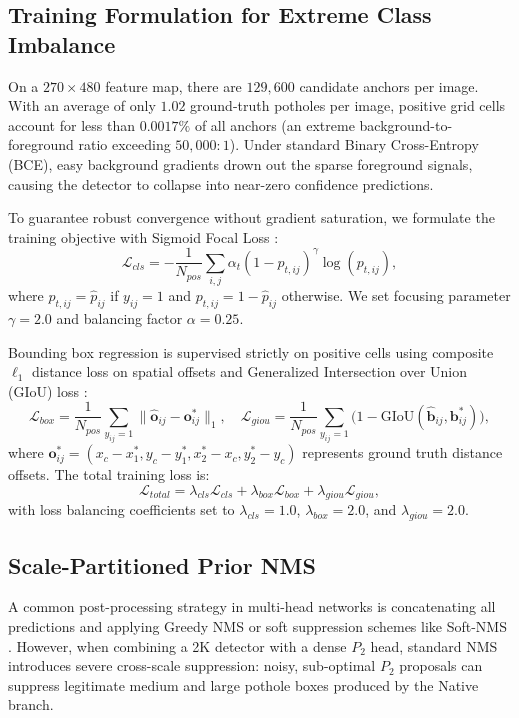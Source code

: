 \documentclass[runningheads]{llncs}
\begin{document}
\subsection{Training Formulation for Extreme Class Imbalance}
On a $270 \times 480$ feature map, there are $129,600$ candidate anchors per image. With an average of only $1.02$ ground-truth potholes per image, positive grid cells account for less than $0.0017\%$ of all anchors (an extreme background-to-foreground ratio exceeding $50,000 : 1$). Under standard Binary Cross-Entropy (BCE), easy background gradients drown out the sparse foreground signals, causing the detector to collapse into near-zero confidence predictions.

To guarantee robust convergence without gradient saturation, we formulate the training objective with Sigmoid Focal Loss \cite{lin2017focal}:
\begin{equation}
    \mathcal{L}_{cls} = -\frac{1}{N_{pos}} \sum_{i, j} \alpha_t (1 - p_{t, ij})^\gamma \log(p_{t, ij}),
\end{equation}
where $p_{t, ij} = \hat{p}_{ij}$ if $y_{ij} = 1$ and $p_{t, ij} = 1 - \hat{p}_{ij}$ otherwise. We set focusing parameter $\gamma = 2.0$ and balancing factor $\alpha = 0.25$.

Bounding box regression is supervised strictly on positive cells using composite $\ell_1$ distance loss on spatial offsets and Generalized Intersection over Union (GIoU) loss \cite{rezatofighi2019generalized,zheng2020distance}:
\begin{equation}
    \mathcal{L}_{box} = \frac{1}{N_{pos}} \sum_{y_{ij}=1} \|\hat{\mathbf{o}}_{ij} - \mathbf{o}_{ij}^*\|_1, \quad
    \mathcal{L}_{giou} = \frac{1}{N_{pos}} \sum_{y_{ij}=1} \big(1 - \text{GIoU}(\hat{\mathbf{b}}_{ij}, \mathbf{b}_{ij}^*)\big),
\end{equation}
where $\mathbf{o}_{ij}^* = (x_c - x_1^*, y_c - y_1^*, x_2^* - x_c, y_2^* - y_c)$ represents ground truth distance offsets. The total training loss is:
\begin{equation}
    \mathcal{L}_{total} = \lambda_{cls} \mathcal{L}_{cls} + \lambda_{box} \mathcal{L}_{box} + \lambda_{giou} \mathcal{L}_{giou},
\end{equation}
with loss balancing coefficients set to $\lambda_{cls} = 1.0$, $\lambda_{box} = 2.0$, and $\lambda_{giou} = 2.0$.

\subsection{Scale-Partitioned Prior NMS}
A common post-processing strategy in multi-head networks is concatenating all predictions and applying Greedy NMS \cite{neubeck2006efficient} or soft suppression schemes like Soft-NMS \cite{bodla2017soft}. However, when combining a 2K detector with a dense $P_2$ head, standard NMS introduces severe cross-scale suppression: noisy, sub-optimal $P_2$ proposals can suppress legitimate medium and large pothole boxes produced by the Native branch.
\end{document}
